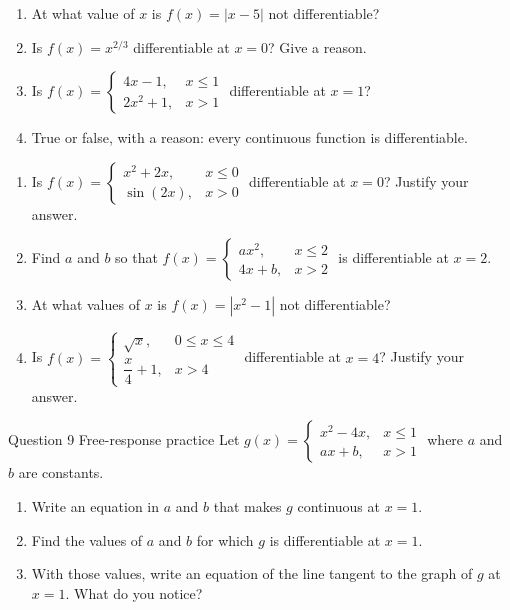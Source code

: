 \documentclass[11pt]{article}
\begin{document}
\begin{enumerate}[leftmargin=*,itemsep=2pt]
  \item At what value of $x$ is $f(x)=|x-5|$ not differentiable?\work{2.3cm}
  \item Is $f(x)=x^{2/3}$ differentiable at $x=0$? Give a reason.\work{2.3cm}
  \item Is $f(x)=\begin{cases}4x-1,&x\le1\\2x^2+1,&x>1\end{cases}$ differentiable at $x=1$?\work{2.3cm}
  \item True or false, with a reason: every continuous function is differentiable.\work{2.3cm}
\end{enumerate}

\begin{enumerate}[leftmargin=*,itemsep=2pt,start=5]
  \item Is $f(x)=\begin{cases}x^2+2x,&x\le0\\\sin(2x),&x>0\end{cases}$ differentiable at $x=0$? Justify your answer.\work{2.8cm}
  \item Find $a$ and $b$ so that $f(x)=\begin{cases}ax^2,&x\le2\\4x+b,&x>2\end{cases}$ is differentiable at $x=2$.\work{2.8cm}
  \item At what values of $x$ is $f(x)=\left|x^2-1\right|$ not differentiable?\work{2.8cm}
  \item Is $f(x)=\begin{cases}\sqrt{x},&0\le x\le4\\\dfrac x4+1,&x>4\end{cases}$ differentiable at $x=4$? Justify your answer.\work{2.8cm}
\end{enumerate}

\begin{frbox}{Question 9 \textperiodcentered{} Free-response practice}
Let $g(x)=\begin{cases}x^2-4x,&x\le1\\ax+b,&x>1\end{cases}$ where $a$ and $b$ are constants.
\begin{enumerate}[label=(\alph*),leftmargin=*,itemsep=2pt]
  \item Write an equation in $a$ and $b$ that makes $g$ continuous at $x=1$.\work{2.6cm}
  \item Find the values of $a$ and $b$ for which $g$ is differentiable at $x=1$.\work{2.6cm}
  \item With those values, write an equation of the line tangent to the graph of $g$ at $x=1$. What do you notice?\work{2.6cm}
\end{enumerate}
\end{frbox}
\end{document}
